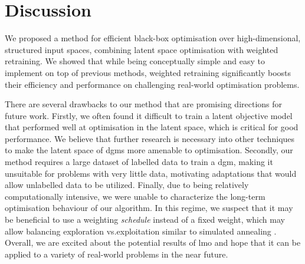 \section{Discussion}
\label{sec:lso:conclusion}
We proposed a method for efficient black-box optimisation over high-dimensional, structured input spaces, combining latent space optimisation with weighted retraining.
We showed that while being conceptually simple and easy to implement on top of previous methods, weighted retraining significantly boosts their efficiency and performance on challenging real-world optimisation problems.

There are several drawbacks to our method that are promising directions for future work.
Firstly, we often found it difficult to train a latent objective model that performed well at optimisation in the latent space, which is critical for good performance.
We believe that further research is necessary into other techniques to make the latent space of \glspl{dgm}
more amenable to optimisation.
Secondly, our method requires a large dataset of labelled data to train a \gls{dgm},
making it unsuitable for problems with very little data,
motivating adaptations that would allow unlabelled data to be utilized.
Finally, due to being relatively computationally intensive, we were unable to characterize
the long-term optimisation behaviour of our algorithm.
In this regime, we suspect that it may be beneficial to use a weighting \emph{schedule}
instead of a fixed weight, which may allow balancing exploration vs.\@ exploitation similar to simulated annealing \citep{van1987simulated}.
Overall, we are excited about the potential results of \gls{lmo} and hope that it can be applied to a variety of real-world problems in the near future.
